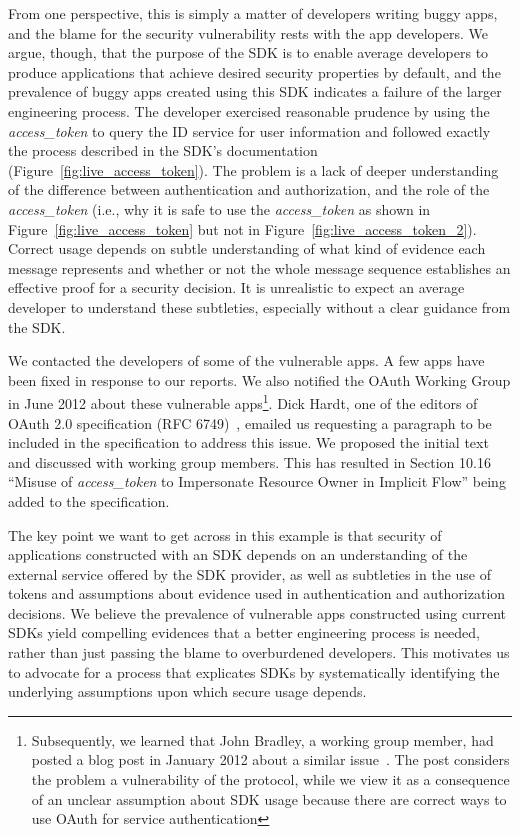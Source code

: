 From one perspective, this is simply a matter of developers writing buggy apps, and the blame for the security vulnerability rests with the app developers.  We argue, though, that the purpose of the SDK is to enable average developers to produce applications that achieve desired security properties by default, and the prevalence of buggy apps created using this SDK indicates a failure of the larger engineering process.  The developer exercised reasonable prudence by using the \emph{access\_token} to query the ID service for user information and followed exactly the process described in the SDK's documentation (Figure~\ref{fig:live_access_token}).  The problem is a lack of deeper understanding of the difference between authentication and authorization, and the role of the \emph{access\_token} (i.e., why it is safe to use the \emph{access\_token} as shown in Figure~\ref{fig:live_access_token} but not in Figure~\ref{fig:live_access_token_2}).  Correct usage depends on subtle understanding of what kind of evidence each message represents and whether or not the whole message sequence establishes an effective proof for a security decision.  It is unrealistic to expect an average developer to understand these subtleties, especially without a clear guidance from the SDK.

We contacted the developers of some of the vulnerable apps. A few apps have been fixed in response to our reports.  We also notified the OAuth Working Group in June 2012 about these vulnerable apps\footnote{Subsequently, we learned that John Bradley, a working group member, had posted a blog post in January 2012 about a similar issue~\cite{OAuthVulBlogPost}. The post considers the problem a vulnerability of the protocol, while we view it as a consequence of an unclear assumption about SDK usage because there are correct ways to use OAuth for service authentication}.  Dick Hardt, one of the editors of OAuth 2.0 specification (RFC 6749)~\cite{OAuth2.0}, emailed us requesting a paragraph to be included in the specification to address this issue.  We proposed the initial text and discussed with working group members.  This has resulted in Section 10.16 ``Misuse of \emph{access\_token} to Impersonate Resource Owner in Implicit Flow'' being added to the specification.

The key point we want to get across in this example is that security of applications constructed with an SDK depends on an understanding of the external service offered by the SDK provider, as well as subtleties in the use of tokens and assumptions about evidence used in authentication and authorization decisions.  We believe the prevalence of vulnerable apps constructed using current SDKs yield compelling evidences that a better engineering process is needed, rather than just passing the blame to overburdened developers.  This motivates us to advocate for a process that explicates SDKs by systematically identifying the underlying assumptions upon which secure usage depends.

